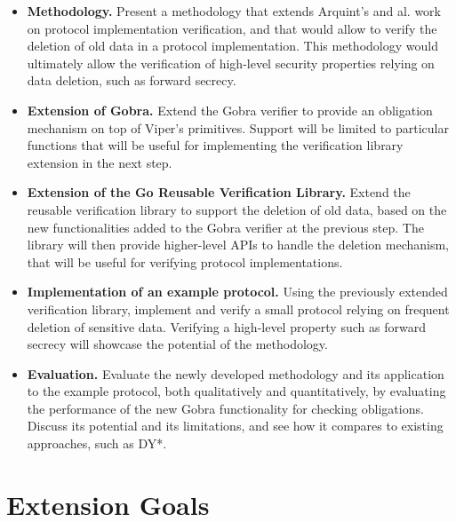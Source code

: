 \documentclass{article}
\begin{document}
\begin{itemize}
      \item \textbf{Methodology.} Present a methodology that extends Arquint's and al. work on protocol implementation verification, and that would allow to verify the deletion of old data in a protocol implementation. This methodology would ultimately allow the verification of high-level security properties relying on data deletion, such as forward secrecy.
      \item \textbf{Extension of Gobra.} Extend the Gobra verifier to provide an obligation mechanism on top of Viper's primitives.
      Support will be limited to particular functions that will be useful for implementing the verification library extension in the next step.
      \item \textbf{Extension of the Go Reusable Verification Library.} Extend the reusable verification library to support the deletion of old data, based on the new functionalities added to the Gobra verifier at the previous step. The library will then provide higher-level APIs to handle the deletion mechanism, that will be useful for verifying protocol implementations.
      \item \textbf{Implementation of an example protocol.} Using the previously extended verification library, implement and verify a small protocol relying on frequent deletion of sensitive data. Verifying a high-level property such as forward secrecy will showcase the potential of the methodology.
      \item \textbf{Evaluation.} Evaluate the newly developed methodology and its application to the example protocol, both qualitatively and quantitatively, by evaluating the performance of the new Gobra functionality for checking obligations. Discuss its potential and its limitations, and see how it compares to existing approaches, such
      as DY*.

\end{itemize}

\section{Extension Goals}
\end{document}
